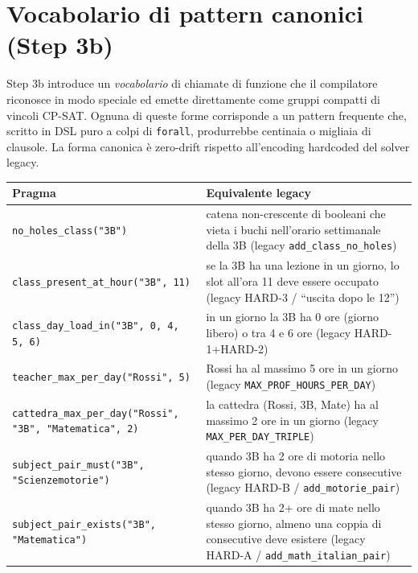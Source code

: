 \section{Vocabolario di pattern canonici (Step 3b)}
\label{sec:dsl-canonici}

Step 3b introduce un \emph{vocabolario} di chiamate di funzione
che il compilatore riconosce in modo speciale ed emette
direttamente come gruppi compatti di vincoli CP-SAT. Ognuna di
queste forme corrisponde a un pattern frequente che, scritto in
DSL puro a colpi di \texttt{forall}, produrrebbe centinaia o
migliaia di clausole. La forma canonica \`e zero-drift rispetto
all'encoding hardcoded del solver legacy.

\begin{tabular}{lp{6.7cm}}
\toprule
\textbf{Pragma} & \textbf{Equivalente legacy} \\
\midrule
\texttt{no\_holes\_class("3B")} &
  catena non-crescente di booleani che vieta i buchi
  nell'orario settimanale della 3B (legacy
  \texttt{add\_class\_no\_holes}) \\

\texttt{class\_present\_at\_hour("3B", 11)} &
  se la 3B ha una lezione in un giorno, lo slot all'ora 11
  deve essere occupato (legacy HARD-3 / ``uscita dopo le 12'') \\

\texttt{class\_day\_load\_in("3B", 0, 4, 5, 6)} &
  in un giorno la 3B ha 0 ore (giorno libero) o tra 4 e 6 ore
  (legacy HARD-1+HARD-2) \\

\texttt{teacher\_max\_per\_day("Rossi", 5)} &
  Rossi ha al massimo 5 ore in un giorno
  (legacy \texttt{MAX\_PROF\_HOURS\_PER\_DAY}) \\

\texttt{cattedra\_max\_per\_day("Rossi", "3B", "Matematica", 2)} &
  la cattedra (Rossi, 3B, Mate) ha al massimo 2 ore in un
  giorno (legacy \texttt{MAX\_PER\_DAY\_TRIPLE}) \\

\texttt{subject\_pair\_must("3B", "Scienzemotorie")} &
  quando 3B ha 2 ore di motoria nello stesso giorno, devono
  essere consecutive (legacy HARD-B / \texttt{add\_motorie\_pair}) \\

\texttt{subject\_pair\_exists("3B", "Matematica")} &
  quando 3B ha 2+ ore di mate nello stesso giorno, almeno una
  coppia di consecutive deve esistere (legacy HARD-A /
  \texttt{add\_math\_italian\_pair}) \\
\bottomrule
\end{tabular}

